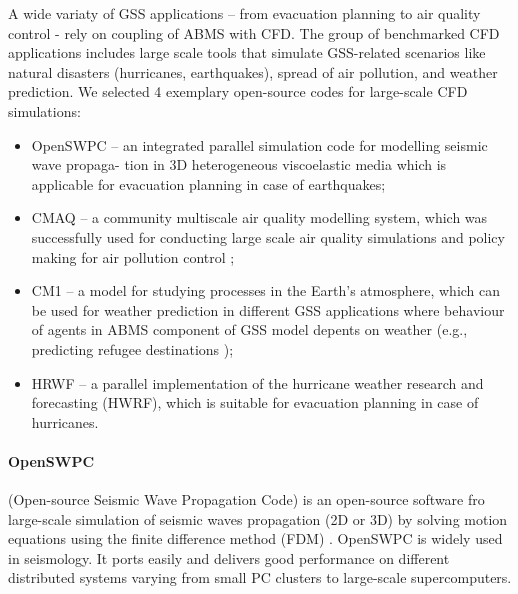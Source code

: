 A wide variaty of GSS applications -- from evacuation planning \cite{2011:Epstein} to air quality control \cite{CHEMEL2014410} - rely on coupling of ABMS with CFD. The group of benchmarked CFD applications includes large scale tools that simulate GSS-related scenarios like natural disasters (hurricanes, earthquakes), spread of air pollution, and weather prediction. We selected 4 exemplary open-source codes for
large-scale CFD simulations:
\begin{itemize}
\item OpenSWPC -- an integrated parallel simulation code for modelling seismic wave propaga-
  tion in 3D heterogeneous viscoelastic media which is applicable for evacuation planning in
  case of earthquakes;
\item CMAQ -- a community multiscale air quality modelling system, which was successfully
  used for conducting large scale air quality simulations and policy making for air pollution
  control \cite{CHEMEL2014410};
\item CM1 -- a model for studying processes in the Earth's atmosphere, which can be used
  for weather prediction in different GSS applications where behaviour of agents in ABMS
  component of GSS model depents on weather (e.g., predicting refugee destinations \cite{Suleimenova2017});
\item HRWF -- a parallel implementation of the hurricane weather research and forecasting (HWRF),
  which is suitable for evacuation planning in case of hurricanes.
\end{itemize}

\paragraph{OpenSWPC} (Open-source Seismic Wave Propagation Code) is an open-source software fro large-scale simulation of seismic waves propagation (2D or 3D) by solving motion equations using the finite difference method (FDM) \cite{OpenSWPC2}. OpenSWPC is widely used in seismology. It ports easily and delivers good performance on different distributed systems varying from small PC clusters to large-scale supercomputers.
\iffalse
Without modifying the code, users can simulate seismic wave propagation using their own speed structure models and the necessary source representations in the input parameter file. The software code is equipped with a frequency-independent damping model based on a generalised Zener (standard linear solid - SLS model) body and an efficiently selected, perfectly matched boundary absorbing layer. It has different modes for the different input data types of the velocity structure model and different source representations, such as single force, torque tensioner and flat frequency, which can be easily selected by input parameters. Common binary data formats, a common network data form (NetCDF), and a seismic analysis code (SAC) are used to input a heterogeneous structure model and simulation results so that users can easily operate their input and output data sets. All codes are written in Fortran 2003 and are available with detailed documents in a public repository.
\fi

